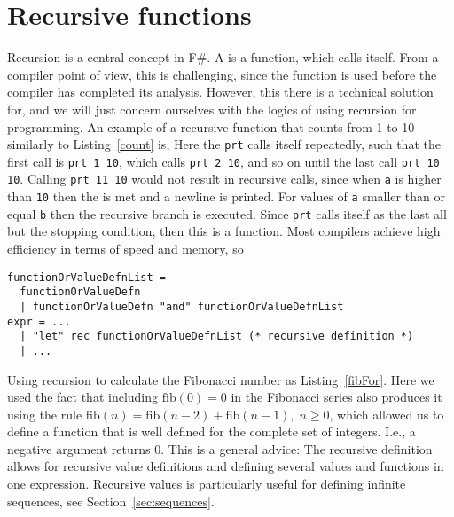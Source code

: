 \section{Recursive functions}
Recursion is a central concept in F\#. A  is a function, which calls itself. From a compiler point of view, this is challenging, since the function is used before the compiler has completed its analysis. However, this there is a technical solution for, and we will just concern ourselves with the logics of using recursion for programming. An example of a recursive function that counts from 1 to 10 similarly to Listing~\ref{count} is,
%
%
Here the \lstinline!prt! calls itself repeatedly, such that the first call is \lstinline!prt 1 10!, which calls \lstinline!prt 2 10!, and so on until the last call \lstinline!prt 10 10!. Calling \lstinline!prt 11 10! would not result in recursive calls, since when \lstinline!a! is higher than \lstinline!10! then the  is met and a newline is printed. For values of \lstinline!a! smaller than or equal \lstinline!b! then the recursive branch is executed. Since \lstinline!prt! calls itself as the last all but the stopping condition, then this is a  function. Most compilers achieve high efficiency in terms of speed and memory, so 
\begin{lstlisting}[language=ebnf]
functionOrValueDefnList = 
  functionOrValueDefn 
  | functionOrValueDefn "and" functionOrValueDefnList
expr = ... 
  | "let" rec functionOrValueDefnList (* recursive definition *)
  | ...
\end{lstlisting}
Using recursion to calculate the Fibonacci number as Listing~\ref{fibFor}.
%
%
Here we used the fact that including $\text{fib}(0)=0$ in the Fibonacci series also produces it using the rule $\text{fib}(n)=\text{fib}(n-2)+\text{fib}(n-1),\; n\geq 0$, which allowed us to define a function that is well defined for the complete set of integers. I.e., a negative argument returns 0. This is a general advice:  The recursive definition allows for recursive value definitions and defining several values and functions in one expression. Recursive values is particularly useful for defining infinite sequences, see Section~\ref{sec:sequences}.

